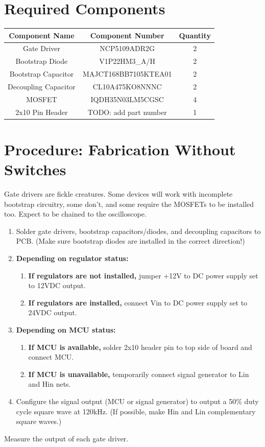 \documentclass[]{report}
\begin{document}
\section{Required Components}
\begin{tabular}{|c|c|c|}
	\hline
	\textbf{Component Name} & \textbf{Component Number} & \textbf{Quantity} \\
	\hline
	Gate Driver & NCP5109ADR2G & 2 \\
	\hline
	Bootstrap Diode & V1P22HM3\_A/H & 2 \\
	\hline
	Bootstrap Capacitor & MAJCT168BB7105KTEA01 & 2 \\
	\hline
	Decoupling Capacitor & CL10A475KO8NNNC & 2 \\
	\hline
	MOSFET & IQDH35N03LM5CGSC  & 4 \\
	\hline
	2x10 Pin Header & TODO: add part number & 1 \\
	\hline
\end{tabular}
\section{Procedure: Fabrication Without Switches}
Gate drivers are fickle creatures. Some devices will work with incomplete bootstrap circuitry, some don't, and some require the MOSFETs to be installed too. Expect to be chained to the oscilloscope.
\begin{enumerate}
	\item Solder gate drivers, bootstrap capacitors/diodes, and decoupling capacitors to PCB. (Make sure bootstrap diodes are installed in the correct direction!)
	\item \textbf{Depending on regulator status:}
	\begin{enumerate}
		\item \textbf{If regulators are not installed,} jumper +12V to DC power supply set to 12VDC output.
		\item \textbf{If regulators are installed,} connect Vin to DC power supply set to 24VDC output.
	\end{enumerate}
	\item \textbf{Depending on MCU status:}
	\begin{enumerate}
		\item \textbf{If MCU is available,} solder 2x10 header pin to top side of board and connect MCU.
		\item \textbf{If MCU is unavailable,} temporarily connect signal generator to Lin and Hin nets. 
	\end{enumerate}
	\item Configure the signal output (MCU or signal generator) to output a 50\% duty cycle square wave at 120kHz. (If possible, make Hin and Lin complementary square waves.) 
\end{enumerate}
Measure the output of each gate driver. 
\end{document}

